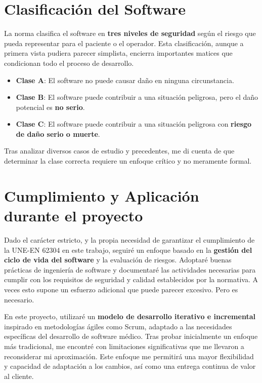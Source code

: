 \section{Clasificación del Software}
La norma clasifica el software en \textbf{tres niveles de seguridad} según el riesgo que pueda representar para el paciente o el operador. Esta clasificación, aunque a primera vista pudiera parecer simplista, encierra importantes matices que condicionan todo el proceso de desarrollo.

\begin{itemize}
    \item \textbf{Clase A}: El software no puede causar daño en ninguna circunstancia.
    \item \textbf{Clase B}: El software puede contribuir a una situación peligrosa, pero el daño potencial es \textbf{no serio}.
    \item \textbf{Clase C}: El software puede contribuir a una situación peligrosa con \textbf{riesgo de daño serio o muerte}.
\end{itemize}

Tras analizar diversos casos de estudio y precedentes, me di cuenta de que determinar la clase correcta requiere un enfoque crítico y no meramente formal. 

\section{Cumplimiento y Aplicación durante el proyecto}
Dado el carácter estricto, y la propia necesidad de garantizar el cumplimiento de la UNE-EN 62304 \cite{UNE-EN-62304} en este trabajo, seguiré un enfoque basado en la \textbf{gestión del ciclo de vida del software} y la evaluación de riesgos. Adoptaré buenas prácticas de ingeniería de software y documentaré las actividades necesarias para cumplir con los requisitos de seguridad y calidad establecidos por la normativa. A veces esto supone un esfuerzo adicional que puede parecer excesivo. Pero es necesario.

En este proyecto, utilizaré un \textbf{modelo de desarrollo iterativo e incremental} inspirado en metodologías ágiles como Scrum, adaptado a las necesidades específicas del desarrollo de software médico. Tras probar inicialmente un enfoque más tradicional, me encontré con limitaciones significativas que me llevaron a reconsiderar mi aproximación. Este enfoque me permitirá una mayor flexibilidad y capacidad de adaptación a los cambios, así como una entrega continua de valor al cliente.

